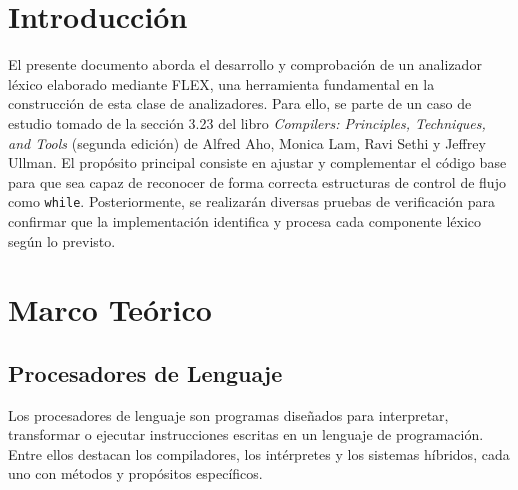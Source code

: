 \documentclass{article}
\begin{document}
\newpage %



\section{Introducción}\label{sec:intr}

El presente documento aborda el desarrollo y comprobación de un analizador léxico elaborado mediante FLEX, una herramienta fundamental en la construcción de esta clase de analizadores. Para ello, se parte de un caso de estudio tomado de la sección 3.23 del libro \textit{Compilers: Principles, Techniques, and Tools} (segunda edición) de Alfred Aho, Monica Lam, Ravi Sethi y Jeffrey Ullman. El propósito principal consiste en ajustar y complementar el código base para que sea capaz de reconocer de forma correcta estructuras de control de flujo como \texttt{while}. Posteriormente, se realizarán diversas pruebas de verificación para confirmar que la implementación identifica y procesa cada componente léxico según lo previsto.


\section{Marco Teórico}\label{sec:marc}

\subsection*{Procesadores de Lenguaje}

Los procesadores de lenguaje son programas diseñados para interpretar, transformar o ejecutar instrucciones escritas en un lenguaje de programación. Entre ellos destacan los compiladores, los intérpretes y los sistemas híbridos, cada uno con métodos y propósitos específicos.
\end{document}

